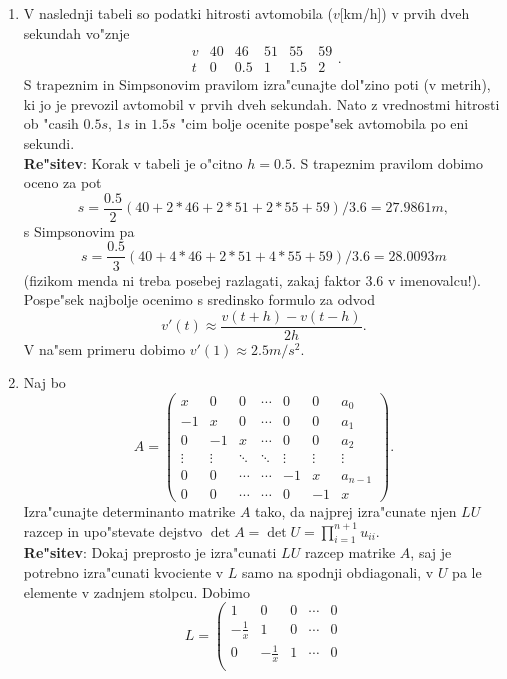 \begin{enumerate}
  \item V naslednji tabeli so podatki hitrosti avtomobila ($v$[km/h])
    v prvih dveh sekundah vo"znje
    $$\begin{array}{l|rrrrr}
    v & 40 & 46 & 51 & 55 & 59\\ \hline
    t & 0  & 0.5 & 1 & 1.5 & 2
    \end{array}.$$
    S trapeznim in Simpsonovim pravilom izra"cunajte dol"zino poti 
    (v me\-trih), ki jo je prevozil avtomobil v prvih dveh sekundah. Nato 
    z vrednostmi hitrosti ob "casih $0.5s$, $1s$ in $1.5s$ "cim bolje ocenite
    pospe"sek avtomobila po eni sekundi.\\
    {\bf Re"sitev}: Korak v tabeli je o"citno $h=0.5$. S trapeznim pravilom
    dobimo oceno za pot
    $$s=\frac{0.5}{2}(40+2*46+2*51+2*55+59)/3.6=27.9861m,$$
    s Simpsonovim pa
    $$s=\frac{0.5}{3}(40+4*46+2*51+4*55+59)/3.6=28.0093m$$
    (fizikom menda ni treba posebej razlagati, 
    zakaj faktor $3.6$ v imenovalcu!).
    Pospe"sek najbolje ocenimo s sredinsko formulo za odvod
    $$v'(t)\approx \frac{v(t+h)-v(t-h)}{2h}.$$
    V na"sem primeru dobimo $v'(1)\approx 2.5m/s^2$.
  \item Naj bo 
    $$A=\left(
      \begin{array}{ccccccc}
        x & 0 & 0 & \cdots & 0 & 0 & a_0\\
        -1& x & 0 & \cdots & 0 & 0 & a_1\\
        0 & -1& x & \cdots & 0 & 0 & a_2\\
        \vdots & \vdots & \ddots & \ddots & \vdots & \vdots & \vdots\\
        0 & 0 & \cdots & \cdots & -1 & x & a_{n-1}\\
        0 & 0 & \cdots & \cdots & 0 & -1 & x
      \end{array}\right) .
    $$
      Izra"cunajte determinanto matrike $A$ tako, da najprej
      izra"cunate njen $LU$ razcep in upo"stevate dejstvo
      $\det A=\det U=\prod_{i=1}^{n+1}u_{ii}$.\\
    {\bf Re"sitev}: Dokaj preprosto je izra"cunati $LU$ razcep
    matrike $A$, saj je potrebno izra"cunati kvociente v $L$
    samo na spodnji obdiagonali, v $U$ pa le elemente v zadnjem
    stolpcu. Dobimo
    $$L=\left(
      \begin{array}{rrrrr}
        1 & 0 & 0 & \cdots & 0\\
        -\frac{1}{x} & 1 & 0 & \cdots &0\\
        0 & -\frac{1}{x} & 1 & \cdots &0\\

\end{array}$$
\end{enumerate}
